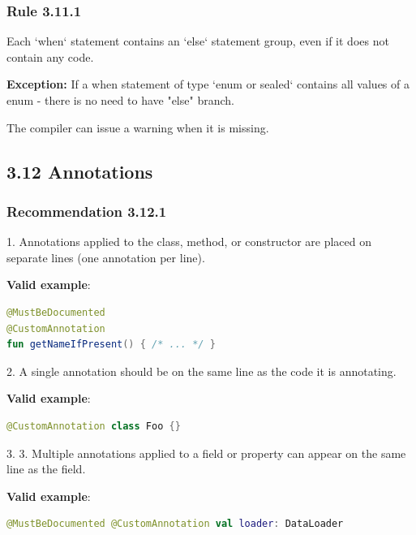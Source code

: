 {{{{\subsubsection*{\textbf{Rule 3.11.1}}
\leavevmode\newline

Each `when` statement contains an `else` statement group, even if it does not contain any code.



\textbf{Exception:} If a when statement of type `enum or sealed` contains all values of a enum - there is no need to have "else" branch.

The compiler can issue a warning when it is missing.



\subsection*{\textbf{3.12 Annotations}}

\subsubsection*{\textbf{Recommendation 3.12.1}}
\leavevmode\newline



1. Annotations applied to the class, method, or constructor are placed on separate lines (one annotation per line).



\textbf{Valid example}:

\begin{lstlisting}[language=Kotlin]
@MustBeDocumented
@CustomAnnotation
fun getNameIfPresent() { /* ... */ }
\end{lstlisting}


2. A single annotation should be on the same line as the code it is annotating.



\textbf{Valid example}:

\begin{lstlisting}[language=Kotlin]
@CustomAnnotation class Foo {}
\end{lstlisting}


3. 3.	Multiple annotations applied to a field or property can appear on the same line as the field.



\textbf{Valid example}:

\begin{lstlisting}[language=Kotlin]
@MustBeDocumented @CustomAnnotation val loader: DataLoader
\end{lstlisting}


}}}}
